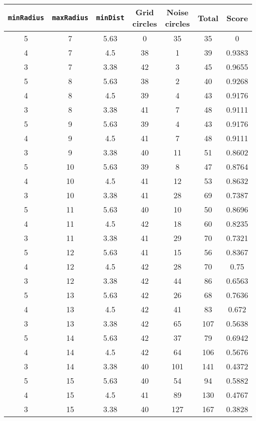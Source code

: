 \documentclass[letterpaper, 12pt]{article}
\begin{document}
\begin{longtable}{|c|c|c|c|c|c|c|}
\hline
\textbf{\texttt{minRadius}} & \textbf{\texttt{maxRadius}} & \textbf{\texttt{minDist}} & \textbf{Grid circles} & \textbf{Noise circles} & \textbf{Total} & \textbf{Score} \\
\hline
5 & 7 & 5.63 & 0 & 35 & 35 & 0 \\
\hline
4 & 7 & 4.5 & 38 & 1 & 39 & 0.9383 \\
\hline
3 & 7 & 3.38 & 42 & 3 & 45 & 0.9655 \\
\hline
5 & 8 & 5.63 & 38 & 2 & 40 & 0.9268 \\
\hline
4 & 8 & 4.5 & 39 & 4 & 43 & 0.9176 \\
\hline
3 & 8 & 3.38 & 41 & 7 & 48 & 0.9111 \\
\hline
5 & 9 & 5.63 & 39 & 4 & 43 & 0.9176 \\
\hline
4 & 9 & 4.5 & 41 & 7 & 48 & 0.9111 \\
\hline
3 & 9 & 3.38 & 40 & 11 & 51 & 0.8602 \\
\hline
5 & 10 & 5.63 & 39 & 8 & 47 & 0.8764 \\
\hline
4 & 10 & 4.5 & 41 & 12 & 53 & 0.8632 \\
\hline
3 & 10 & 3.38 & 41 & 28 & 69 & 0.7387 \\
\hline
5 & 11 & 5.63 & 40 & 10 & 50 & 0.8696 \\
\hline
4 & 11 & 4.5 & 42 & 18 & 60 & 0.8235 \\
\hline
3 & 11 & 3.38 & 41 & 29 & 70 & 0.7321 \\
\hline
5 & 12 & 5.63 & 41 & 15 & 56 & 0.8367 \\
\hline
4 & 12 & 4.5 & 42 & 28 & 70 & 0.75 \\
\hline
3 & 12 & 3.38 & 42 & 44 & 86 & 0.6563 \\
\hline
5 & 13 & 5.63 & 42 & 26 & 68 & 0.7636 \\
\hline
4 & 13 & 4.5 & 42 & 41 & 83 & 0.672 \\
\hline
3 & 13 & 3.38 & 42 & 65 & 107 & 0.5638 \\
\hline
5 & 14 & 5.63 & 42 & 37 & 79 & 0.6942 \\
\hline
4 & 14 & 4.5 & 42 & 64 & 106 & 0.5676 \\
\hline
3 & 14 & 3.38 & 40 & 101 & 141 & 0.4372 \\
\hline
5 & 15 & 5.63 & 40 & 54 & 94 & 0.5882 \\
\hline
4 & 15 & 4.5 & 41 & 89 & 130 & 0.4767 \\
\hline
3 & 15 & 3.38 & 40 & 127 & 167 & 0.3828 \\

\end{longtable}
\end{document}
